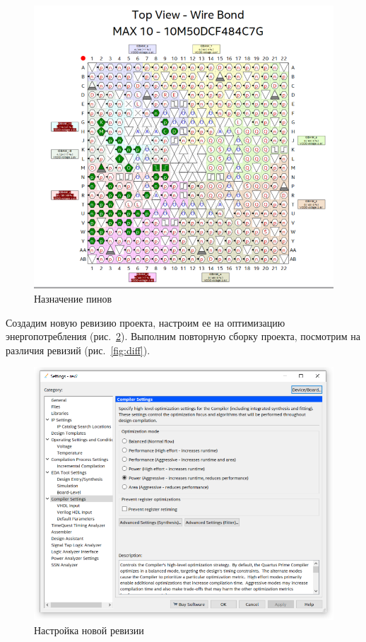 \documentclass[a4paper,14pt]{article}
\begin{document}
\begin{figure}[H]
	\centering
	\includegraphics[width=0.8\linewidth]{image/pins}
	\caption{Назначение пинов}
	\label{fig:pins}
\end{figure}

Создадим новую ревизию проекта, настроим ее на оптимизацию энергопотребления (рис.~\ref{fig:settings}).
Выполним повторную сборку проекта, посмотрим на различия ревизий (рис.~\ref{fig:diff}).

\begin{figure}[H]
	\centering
	\includegraphics[width=0.8\linewidth]{image/settings}
	\caption{Настройка новой ревизии}
	\label{fig:settings}
\end{figure}
\end{document}
